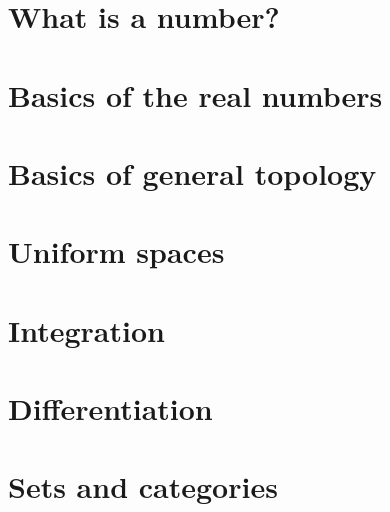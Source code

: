 \documentclass[11pt,fleqn]{book} %
\begin{document}
\chapter{What is a number?}\label{chp1}




\chapter{Basics of the real numbers}




\chapter{Basics of general topology}




\chapter{Uniform spaces}\label{chp5}




\chapter{Integration}\label{chp5xx}




\chapter{Differentiation}\label{chp5x}




\appendix

\chapter{Sets and categories}








\cleardoublepage
{}
\setlength{\columnsep}{0.75cm}
\printindex
\printindex[notation]

\end{document}
